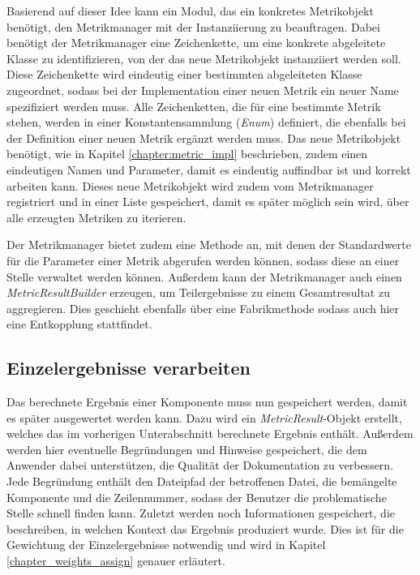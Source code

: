 Basierend auf dieser Idee kann ein Modul, das ein konkretes Metrikobjekt benötigt, den Metrikmanager mit der Instanziierung zu beauftragen. Dabei benötigt der Metrikmanager eine Zeichenkette, um eine konkrete abgeleitete Klasse zu identifizieren, von der das neue Metrikobjekt instanziiert werden soll. Diese Zeichenkette wird eindeutig einer bestimmten abgeleiteten Klasse zugeordnet, sodass bei der Implementation einer neuen Metrik ein neuer Name spezifiziert werden muss. Alle Zeichenketten, die für eine bestimmte Metrik stehen, werden in einer Konstantensammlung  (\textit{Enum}) definiert, die ebenfalls bei der Definition einer neuen Metrik ergänzt werden muss.  Das neue Metrikobjekt benötigt, wie in Kapitel \ref{chapter:metric_impl} beschrieben, zudem einen eindeutigen Namen und Parameter, damit es eindeutig auffindbar ist und korrekt arbeiten kann. Dieses neue Metrikobjekt wird zudem vom Metrikmanager registriert und in einer Liste gespeichert, damit es später möglich sein wird, über alle erzeugten Metriken zu iterieren. 

Der Metrikmanager bietet zudem eine Methode an, mit denen der Standardwerte für die Parameter einer Metrik abgerufen werden können, sodass diese an einer Stelle verwaltet werden können. Außerdem kann der Metrikmanager auch einen \textit{MetricResultBuilder} erzeugen, um Teilergebnisse zu einem Gesamtresultat zu aggregieren. Dies geschieht ebenfalls über eine Fabrikmethode sodass auch hier eine Entkopplung stattfindet. 

\subsection{Einzelergebnisse verarbeiten}\label{chapter:store_metric}

Das berechnete Ergebnis einer Komponente muss nun gespeichert werden, damit es später ausgewertet werden kann. Dazu wird ein \textit{MetricResult}-Objekt erstellt, welches das im vorherigen Unterabschnitt berechnete Ergebnis enthält. Außerdem werden hier eventuelle Begründungen und Hinweise gespeichert, die dem Anwender dabei unterstützen, die Qualität der Dokumentation zu verbessern. Jede Begründung enthält den Dateipfad der betroffenen Datei, die bemängelte Komponente und die Zeilennummer, sodass der Benutzer die problematische Stelle schnell finden kann. Zuletzt werden noch Informationen gespeichert, die beschreiben, in welchen Kontext das Ergebnis produziert wurde. Dies ist für die Gewichtung der Einzelergebnisse notwendig und wird in Kapitel \ref{chapter_weights_assign} genauer erläutert. 

